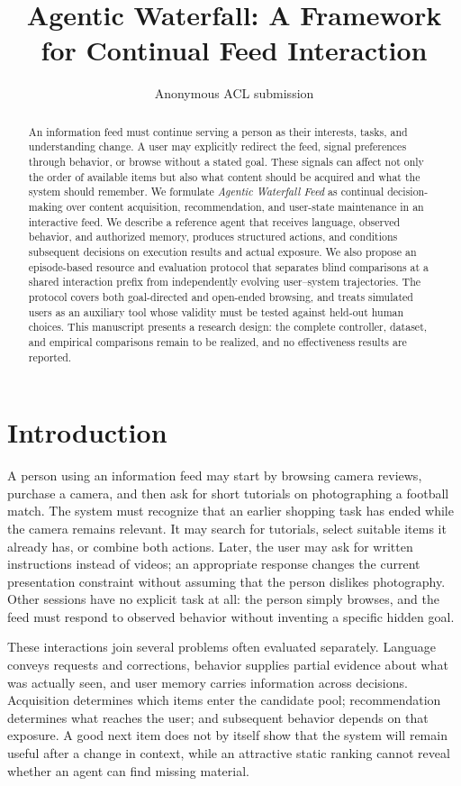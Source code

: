 \documentclass[11pt]{article}
\title{Agentic Waterfall: A Framework for Continual Feed Interaction}
\author{Anonymous ACL submission}
\begin{document}
\maketitle

\begin{abstract}
An information feed must continue serving a person as their interests, tasks, and understanding change. A user may explicitly redirect the feed, signal preferences through behavior, or browse without a stated goal. These signals can affect not only the order of available items but also what content should be acquired and what the system should remember. We formulate \emph{Agentic Waterfall Feed} as continual decision-making over content acquisition, recommendation, and user-state maintenance in an interactive feed. We describe a reference agent that receives language, observed behavior, and authorized memory, produces structured actions, and conditions subsequent decisions on execution results and actual exposure. We also propose an episode-based resource and evaluation protocol that separates blind comparisons at a shared interaction prefix from independently evolving user--system trajectories. The protocol covers both goal-directed and open-ended browsing, and treats simulated users as an auxiliary tool whose validity must be tested against held-out human choices. This manuscript presents a research design: the complete controller, dataset, and empirical comparisons remain to be realized, and no effectiveness results are reported.
\end{abstract}

\section{Introduction}
A person using an information feed may start by browsing camera reviews, purchase a camera, and then ask for short tutorials on photographing a football match. The system must recognize that an earlier shopping task has ended while the camera remains relevant. It may search for tutorials, select suitable items it already has, or combine both actions. Later, the user may ask for written instructions instead of videos; an appropriate response changes the current presentation constraint without assuming that the person dislikes photography. Other sessions have no explicit task at all: the person simply browses, and the feed must respond to observed behavior without inventing a specific hidden goal.

These interactions join several problems often evaluated separately. Language conveys requests and corrections, behavior supplies partial evidence about what was actually seen, and user memory carries information across decisions. Acquisition determines which items enter the candidate pool; recommendation determines what reaches the user; and subsequent behavior depends on that exposure. A good next item does not by itself show that the system will remain useful after a change in context, while an attractive static ranking cannot reveal whether an agent can find missing material.
\end{document}
